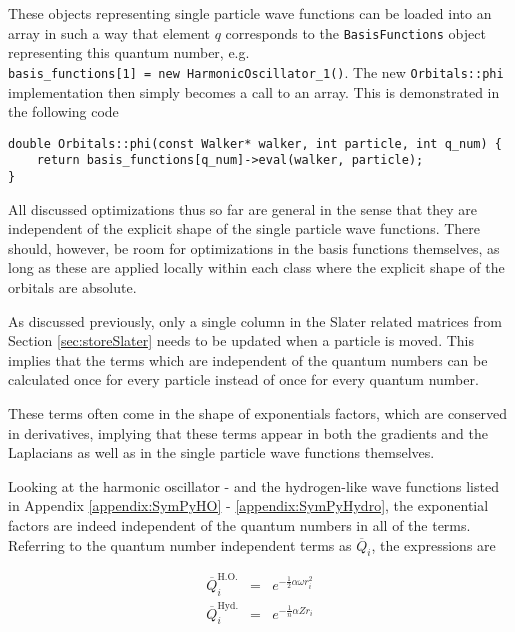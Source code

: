 These objects representing single particle wave functions can be loaded into an array in such a way that element $q$ corresponds to the \verb+BasisFunctions+ object representing this quantum number, e.g.~\\\verb+basis_functions[1] = new HarmonicOscillator_1()+. The new \verb+Orbitals::phi+ implementation then simply becomes a call to an array. This is demonstrated in the following code

\vspace{0.25cm}
\begin{lstlisting}[caption={The implementation of the single particle basis used in the code. It is simply a call to an array holding all the different single particle wave functions. The quantum number is used as an index, and the corresponding evaluation function is called with the supplied walker for the given particle.}]
double Orbitals::phi(const Walker* walker, int particle, int q_num) {
    return basis_functions[q_num]->eval(walker, particle);
}
\end{lstlisting}

All discussed optimizations thus so far are general in the sense that they are independent of the explicit shape of the single particle wave functions. There should, however, be room for optimizations in the basis functions themselves, as long as these are applied locally within each class where the explicit shape of the orbitals are absolute.

As discussed previously, only a single column in the Slater related matrices from Section \ref{sec:storeSlater} needs to be updated when a particle is moved. This implies that the terms which are independent of the quantum numbers can be calculated once for every particle instead of once for every quantum number. 

These terms often come in the shape of exponentials factors, which are conserved in derivatives, implying that these terms appear in both the gradients and the Laplacians as well as in the single particle wave functions themselves.

Looking at the harmonic oscillator - and the hydrogen-like wave functions listed in Appendix \ref{appendix:SymPyHO} - \ref{appendix:SymPyHydro}, the exponential factors are indeed independent of the quantum numbers in all of the terms. Referring to the quantum number independent terms as $\overline{Q}_i$, the expressions are 

\begin{eqnarray}
\overline{Q}_i^\mathrm{H.O.} &=& e^{-\frac{1}{2}\alpha\omega r_i^2} \\
 \overline{Q}_i^\mathrm{Hyd.} &=& e^{-\frac{1}{n}\alpha Z r_i}
\end{eqnarray}

